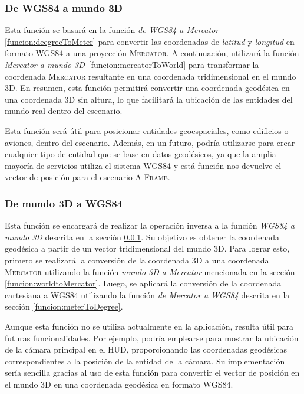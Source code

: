 \documentclass[a4paper, 11pt]{book}
\begin{document}
\subsubsection{De WGS84 a mundo 3D}
\label{funcion:degreeToWorld}
Esta función se basará en la función \emph{de WGS84 a Mercator} \ref{funcion:deegreeToMeter} para convertir las coordenadas de \emph{latitud} y \emph{longitud} en formato \textsc{WGS84} a una proyección \textsc{Mercator}. A continuación, utilizará la función \emph{Mercator a mundo 3D}~\ref{funcion:mercatorToWorld} para transformar la coordenada \textsc{Mercator} resultante en una coordenada tridimensional en el mundo \textsc{3D}. En resumen, esta función permitirá convertir una coordenada geodésica en una coordenada \textsc{3D} sin altura, lo que facilitará la ubicación de las entidades del mundo real dentro del escenario.

Esta función será útil para posicionar entidades geoespaciales, como edificios o aviones, dentro del escenario. Además, en un futuro, podría utilizarse para crear cualquier tipo de entidad que se base en datos geodésicos, ya que la amplia mayoría de servicios utiliza el sistema \textsc{WGS84} y está función nos devuelve el vector de posición para el escenario \textsc{A-Frame}.

\subsubsection{De mundo 3D a WGS84}
\label{funcion:worldToDegree}
Esta función se encargará de realizar la operación inversa a la función \emph{WGS84 a mundo 3D} descrita en la sección \ref{funcion:degreeToWorld}. Su objetivo es obtener la coordenada geodésica a partir de un vector tridimensional del mundo 3D. Para lograr esto, primero se realizará la conversión de la coordenada \textsc{3D} a una coordenada \textsc{Mercator} utilizando la función \emph{mundo 3D a Mercator} mencionada en la sección \ref{funcion:worldtoMercator}. Luego, se aplicará la conversión de la coordenada cartesiana a \textsc{WGS84} utilizando la función \emph{de Mercator a WGS84} descrita en la sección \ref{funcion:meterToDegree}.

Aunque esta función no se utiliza actualmente en la aplicación, resulta útil para futuras funcionalidades. Por ejemplo, podría emplearse para mostrar la ubicación de la cámara principal en el \textsc{\gls{HUD}}, proporcionando las coordenadas geodésicas correspondientes a la posición de la entidad de la cámara. Su implementación sería sencilla gracias al uso de esta función para convertir el vector de posición en el mundo 3D en una coordenada geodésica en formato \textsc{WGS84}.
\end{document}
